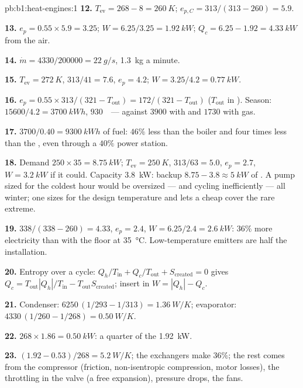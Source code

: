 \begin{solution}{pb:b1:heat-engines:1}
\textbf{12.} $T_{\mathrm{ev}} = 268 - 8 = \qty{260}{K}$; $e_{p,C} = 313/(313 - 260)
= 5.9$.

\textbf{13.} $e_p = 0.55 \times 5.9 = 3.25$; $W = 6.25/3.25 = \qty{1.92}{kW}$;
$Q_c = 6.25 - 1.92 = \qty{4.33}{kW}$ from the air.

\textbf{14.} $\dot m = 4330/200000 = \qty{22}{g/s}$, \qty{1.3}{kg} a minute.

\textbf{15.} $T_{\mathrm{ev}} = \qty{272}{K}$, $313/41 = 7.6$, $e_p = 4.2$;
$W = 3.25/4.2 = \qty{0.77}{kW}$.

\textbf{16.} $e_p = 0.55 \times 313/(321 - T_{\mathrm{out}}) = 172/(321 -
T_{\mathrm{out}})$ ($T_{\mathrm{out}}$ in ). Season: $15600/4.2 =
\qty{3700}{kW h}$, $930$~\texteuro\ --- against $3900$ with  and
$1730$ with gas.

\textbf{17.} $3700/0.40 = \qty{9300}{kW h}$ of fuel: $46\%$ less than the
boiler and four times less than the , even through a $40\%$
power station.

\textbf{18.} Demand $250 \times 35 = \qty{8.75}{kW}$; $T_{\mathrm{ev}} = \qty{250}{K}$,
$313/63 = 5.0$, $e_p = 2.7$, $W = \qty{3.2}{kW}$ if it could. Capacity
\qty{3.8}{kW}: backup $8.75 - 3.8 \approx \qty{5}{kW}$ of . A pump
sized for the coldest hour would be oversized --- and cycling
inefficiently --- all winter; one sizes for the design temperature and
lets a cheap  cover the rare extreme.

\textbf{19.} $338/(338 - 260) = 4.33$, $e_p = 2.4$, $W = 6.25/2.4 =
\qty{2.6}{kW}$: $36\%$ more electricity than with the floor at
\qty{35}{\degreeCelsius}. Low-temperature emitters are half the
installation.

\textbf{20.} Entropy over a cycle: $Q_h/T_{\mathrm{in}} + Q_c/T_{\mathrm{out}} +
S_{\mathrm{created}} = 0$ gives $Q_c = T_{\mathrm{out}}|Q_h|/T_{\mathrm{in}} -
T_{\mathrm{out}}S_{\mathrm{created}}$; insert in $W = |Q_h| - Q_c$.

\textbf{21.} Condenser: $6250\,(1/293 - 1/313) = \qty{1.36}{W/K}$; evaporator:
$4330\,(1/260 - 1/268) = \qty{0.50}{W/K}$.

\textbf{22.} $268 \times 1.86 = \qty{0.50}{kW}$: a quarter of the
\qty{1.92}{kW}.

\textbf{23.} $(1.92 - 0.53)/268 = \qty{5.2}{W/K}$; the exchangers make
$36\%$; the rest comes from the compressor (friction, non-isentropic
compression, motor losses), the throttling in the valve (a free
expansion), pressure drops, the fans.


\end{solution}
